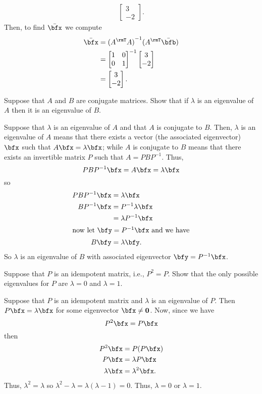 \begin{questions}
\begin{solution}
\begin{align*}
\begin{bmatrix}
        3\\-2
        \end{bmatrix}.
    \end{align*}
    Then, to find $\bar\bfx$ we compute
    \begin{align*}
      \bar\bfx
      &={(A^\rmT A)}^{-1}(A^\rmT\bar\bfb)\\
      &=
      \begin{bmatrix}
        1&0\\
        0&1\\
      \end{bmatrix}^{-1}
      \begin{bmatrix}
        3\\-2
      \end{bmatrix}\\
      &=\begin{bmatrix}
        3\\-2
        \end{bmatrix}.
    \end{align*}
  \end{solution}
  \question[4] Suppose that $A$ and $B$ are conjugate matrices. Show that
  if $\lambda$ is an eigenvalue of $A$ then it is an eigenvalue of $B$.
  \begin{solution}
    Suppose that $\lambda$ is an eigenvalue of $A$ and that $A$ is
    conjugate to $B$. Then, $\lambda$ is an eigenvalue of $A$ means that
    there exists a vector (the associated eigenvector) $\bfx$ such that
    $A\bfx=\lambda\bfx$; while $A$ is conjugate to $B$ means that there
    exists an invertible matrix $P$ such that $A=PBP^{-1}$. Thus,
    \[
      PBP^{-1}\bfx=A\bfx=\lambda\bfx
    \]
    so
    \begin{align*}
      PBP^{-1}\bfx
      &=\lambda\bfx\\
      BP^{-1}\bfx&=P^{-1}\lambda\bfx\\
      &=\lambda P^{-1}\bfx\\
      \intertext{now let $\bfy=P^{-1}\bfx$ and we have}
      B\bfy&=\lambda\bfy.
    \end{align*}
    So $\lambda$ is an eigenvalue of $B$ with associated eigenvector
    $\bfy=P^{-1}\bfx$.
  \end{solution}
  \question[8] Suppose that $P$ is an idempotent matrix, i.e., $P^2=P$. Show
  that the only possible eigenvalues for $P$ are $\lambda=0$ and
  $\lambda=1$.
  \begin{solution}
    Suppose that $P$ is an idempotent matrix and $\lambda$ is an eigenvalue
    of $P$. Then $P\bfx=\lambda\bfx$ for some eigenvector $\bfx\neq
    \mathbf{0}$. Now, since we have
    \[
      P^2\bfx=P\bfx
    \]
    then
    \begin{align*}
      P^2\bfx&=P(P\bfx)\\
      P\bfx&=\lambda P\bfx\\
      \lambda\bfx&=\lambda^2\bfx.
    \end{align*}
    Thus, $\lambda^2=\lambda$ so
    $\lambda^2-\lambda=\lambda(\lambda-1)=0$. Thus, $\lambda=0$ or
    $\lambda=1$.
  \end{solution}
\end{questions}
